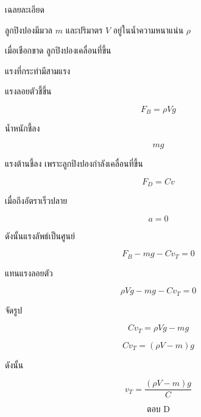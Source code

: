 \begin{examplebox}{เฉลยละเอียด}

ลูกปิงปองมีมวล $m$ และปริมาตร $V$
อยู่ในน้ำความหนาแน่น $\rho$

เมื่อเชือกขาด ลูกปิงปองเคลื่อนที่ขึ้น

แรงที่กระทำมีสามแรง

แรงลอยตัวชี้ขึ้น

\[
F_B=\rho Vg
\]

น้ำหนักชี้ลง

\[
mg
\]

แรงต้านชี้ลง เพราะลูกปิงปองกำลังเคลื่อนที่ขึ้น

\[
F_D=Cv
\]

เมื่อถึงอัตราเร็วปลาย

\[
a=0
\]

ดังนั้นแรงลัพธ์เป็นศูนย์

\[
F_B-mg-Cv_T=0
\]

แทนแรงลอยตัว

\[
\rho Vg-mg-Cv_T=0
\]

จัดรูป

\[
Cv_T
=
\rho Vg-mg
\]

\[
Cv_T
=
(\rho V-m)g
\]

ดังนั้น

\[
\boxed{
v_T
=
\frac{(\rho V-m)g}{C}
}
\]

\[
\boxed{\text{ตอบ D}}
\]
\end{examplebox}
